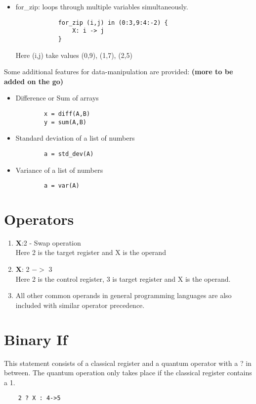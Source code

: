 \begin{itemize}
\begin{itemize}
\begin{itemize}
            \item for\_zip: loops through multiple variables simultaneously. 
            \begin{lstlisting}
            for_zip (i,j) in (0:3,9:4:-2) {
                X: i -> j
            }
            \end{lstlisting}
            Here (i,j) take values (0,9), (1,7), (2,5)
        \end{itemize}
    \end{itemize}
\end{itemize}

Some additional features for data-manipulation are provided: \textbf{(more to be added on the go)}
\begin{itemize}
    \item Difference or Sum of arrays
    \begin{lstlisting}
        x = diff(A,B)
        y = sum(A,B)
    \end{lstlisting}

    \item Standard deviation of a list of numbers
    \begin{lstlisting}
        a = std_dev(A)    
    \end{lstlisting}
    
    \item Variance of a list of numbers
    \begin{lstlisting}
        a = var(A)    
    \end{lstlisting}
    
\end{itemize}

\section{Operators}
\begin{enumerate}
    \item \textbf{X}:2 - Swap operation\\
    Here 2 is the target register and X is the operand
    \item \textbf{X}: 2 $->$ 3\\  Here 2 is the control register, 3 is target register and X is the operand.
    \item All other common operands in general programming languages are also included with similar operator precedence.
\end{enumerate}


\section{Binary If}
This statement consists of a classical register and a quantum operator with a ? in between. The quantum operation only takes place if the classical register contains a 1. 
\begin{lstlisting}
    2 ? X : 4->5 
\end{lstlisting}

